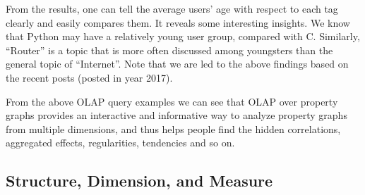 From the results, one can tell the average users' age with respect to each tag clearly and easily compares them. It reveals some interesting insights. We know that Python may have a relatively young user group, compared with C. Similarly, ``Router'' is a topic that is more often discussed among youngsters than the general topic of ``Internet''. Note that we are led to the above findings based on the recent posts (posted in year 2017).

%
%
%
%	
%	
%

From the above OLAP query examples we can see that OLAP over property graphs provides an interactive and informative way to analyze property graphs from multiple dimensions, and thus helps people find the hidden correlations, aggregated effects, regularities, tendencies and so on.

\subsection{Structure, Dimension, and Measure}
\label{Structure, Dimension, and Measure}

